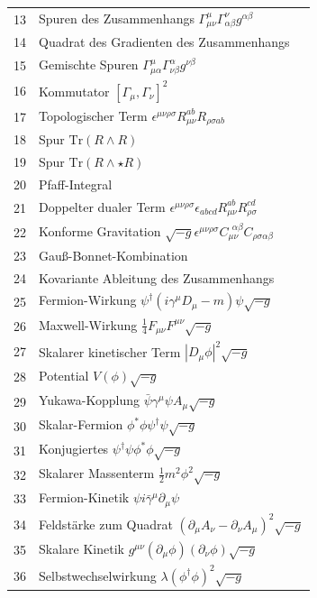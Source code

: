 \documentclass[11pt,a4paper]{article}
\begin{document}
\begin{longtable}{r l}
		13 & Spuren des Zusammenhangs \(\Gamma^{\mu}_{\mu\nu}\Gamma^{\nu}_{\alpha\beta}g^{\alpha\beta}\) \\
		14 & Quadrat des Gradienten des Zusammenhangs \\
		15 & Gemischte Spuren \(\Gamma^{\mu}_{\mu\alpha}\Gamma^{\alpha}_{\nu\beta}g^{\nu\beta}\) \\
		16 & Kommutator \([\Gamma_\mu, \Gamma_\nu]^2\) \\
		17 & Topologischer Term \(\epsilon^{\mu\nu\rho\sigma}R_{\mu\nu}^{ab}R_{\rho\sigma ab}\) \\
		18 & Spur \(\mathrm{Tr}(R\wedge R)\) \\
		19 & Spur \(\mathrm{Tr}(R\wedge\star R)\) \\
		20 & Pfaff-Integral \\
		21 & Doppelter dualer Term \(\epsilon^{\mu\nu\rho\sigma}\epsilon_{abcd}R_{\mu\nu}^{ab}R_{\rho\sigma}^{cd}\) \\
		22 & Konforme Gravitation \(\sqrt{-g}\epsilon^{\mu\nu\rho\sigma}C_{\mu\nu}^{\ \ \alpha\beta}C_{\rho\sigma\alpha\beta}\) \\
		23 & Gauß-Bonnet-Kombination \\
		24 & Kovariante Ableitung des Zusammenhangs \\
		25 & Fermion-Wirkung \(\psi^\dagger(i\gamma^\mu D_\mu - m)\psi\sqrt{-g}\) \\
		26 & Maxwell-Wirkung \(\frac{1}{4}F_{\mu\nu}F^{\mu\nu}\sqrt{-g}\) \\
		27 & Skalarer kinetischer Term \(|D_\mu\phi|^2\sqrt{-g}\) \\
		28 & Potential \(V(\phi)\sqrt{-g}\) \\
		29 & Yukawa-Kopplung \(\bar{\psi}\gamma^\mu\psi A_\mu\sqrt{-g}\) \\
		30 & Skalar-Fermion \(\phi^*\phi\psi^\dagger\psi\sqrt{-g}\) \\
		31 & Konjugiertes \(\psi^\dagger\psi\phi^*\phi\sqrt{-g}\) \\
		32 & Skalarer Massenterm \(\frac{1}{2}m^2\phi^2\sqrt{-g}\) \\
		33 & Fermion-Kinetik \(\psi i\bar{\gamma}^\mu\partial_\mu\psi\) \\
		34 & Feldstärke zum Quadrat \((\partial_\mu A_\nu - \partial_\nu A_\mu)^2\sqrt{-g}\) \\
		35 & Skalare Kinetik \(g^{\mu\nu}(\partial_\mu\phi)(\partial_\nu\phi)\sqrt{-g}\) \\
		36 & Selbstwechselwirkung \(\lambda(\phi^\dagger\phi)^2\sqrt{-g}\) \\

\end{longtable}
\end{document}
